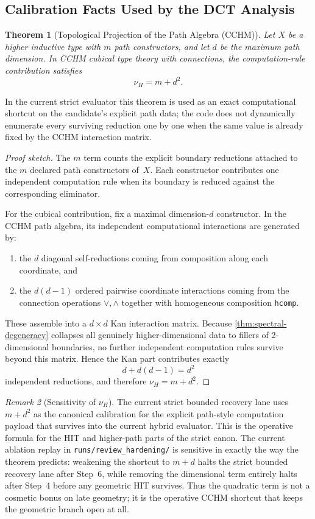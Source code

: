 \documentclass[11pt,a4paper]{article}
\theoremstyle{plain}
\newtheorem{theorem}{Theorem}[section]
\theoremstyle{definition}
\theoremstyle{remark}
\newtheorem{remark}[theorem]{Remark}
\begin{document}
\subsection{Calibration Facts Used by the DCT Analysis}

\begin{theorem}[Topological Projection of the Path Algebra (CCHM)]
\label{thm:topological-projection}
Let $X$ be a higher inductive type with $m$ path constructors, and let $d$ be the maximum path dimension.
In CCHM cubical type theory with connections, the computation-rule contribution satisfies
\[
  \nu_H = m + d^2.
\]
\end{theorem}

\noindent In the current strict evaluator this theorem is used as an exact computational shortcut on the candidate's explicit path data; the code does not dynamically enumerate every surviving reduction one by one when the same value is already fixed by the CCHM interaction matrix.

\begin{proof}[Proof sketch]
The $m$ term counts the explicit boundary reductions attached to the $m$ declared path constructors of~$X$.
Each constructor contributes one independent computation rule when its boundary is reduced against the corresponding eliminator.

For the cubical contribution, fix a maximal dimension-$d$ constructor.
In the CCHM path algebra, its independent computational interactions are generated by:
\begin{enumerate}[nosep]
    \item the $d$ diagonal self-reductions coming from composition along each coordinate, and
    \item the $d(d-1)$ ordered pairwise coordinate interactions coming from the connection operations $\lor,\land$ together with homogeneous composition \texttt{hcomp}.
\end{enumerate}
These assemble into a $d \times d$ Kan interaction matrix.
Because \cref{thm:spectral-degeneracy} collapses all genuinely higher-dimensional data to fillers of 2-dimensional boundaries, no further independent computation rules survive beyond this matrix.
Hence the Kan part contributes exactly
\[
  d + d(d-1) = d^2
\]
independent reductions, and therefore $\nu_H = m + d^2$.
\end{proof}

\begin{remark}[Sensitivity of $\nu_H$]
\label{rem:nuH-sensitivity}
The current strict bounded recovery lane uses $m+d^2$ as the canonical calibration for the explicit path-style computation payload that survives into the current hybrid evaluator.
This is the operative formula for the HIT and higher-path parts of the strict canon.
The current ablation replay in \texttt{runs/review\_hardening/} is sensitive in exactly the way the theorem predicts: weakening the shortcut to $m+d$ halts the strict bounded recovery lane after Step~6, while removing the dimensional term entirely halts after Step~4 before any geometric HIT survives.
Thus the quadratic term is not a cosmetic bonus on late geometry; it is the operative CCHM shortcut that keeps the geometric branch open at all.
\end{remark}
\end{document}
